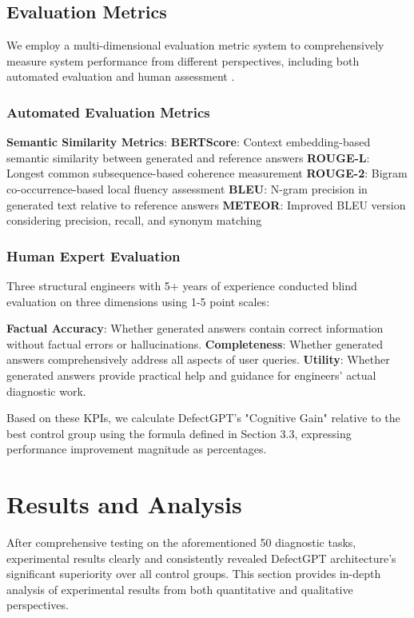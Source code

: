 \subsection{Evaluation Metrics}

We employ a multi-dimensional evaluation metric system to comprehensively measure system performance from different perspectives, including both automated evaluation and human assessment \cite{hernandez2022measuring}.

\subsubsection{Automated Evaluation Metrics}

\textbf{Semantic Similarity Metrics}:
\textbf{BERTScore}: Context embedding-based semantic similarity between generated and reference answers
\textbf{ROUGE-L}: Longest common subsequence-based coherence measurement
\textbf{ROUGE-2}: Bigram co-occurrence-based local fluency assessment
\textbf{BLEU}: N-gram precision in generated text relative to reference answers
\textbf{METEOR}: Improved BLEU version considering precision, recall, and synonym matching

\subsubsection{Human Expert Evaluation}

Three structural engineers with 5+ years of experience conducted blind evaluation on three dimensions using 1-5 point scales:

\textbf{Factual Accuracy}: Whether generated answers contain correct information without factual errors or hallucinations.
\textbf{Completeness}: Whether generated answers comprehensively address all aspects of user queries.
\textbf{Utility}: Whether generated answers provide practical help and guidance for engineers' actual diagnostic work.

Based on these KPIs, we calculate DefectGPT's "Cognitive Gain" relative to the best control group using the formula defined in Section 3.3, expressing performance improvement magnitude as percentages.

\section{Results and Analysis}

After comprehensive testing on the aforementioned 50 diagnostic tasks, experimental results clearly and consistently revealed DefectGPT architecture's significant superiority over all control groups. This section provides in-depth analysis of experimental results from both quantitative and qualitative perspectives.

